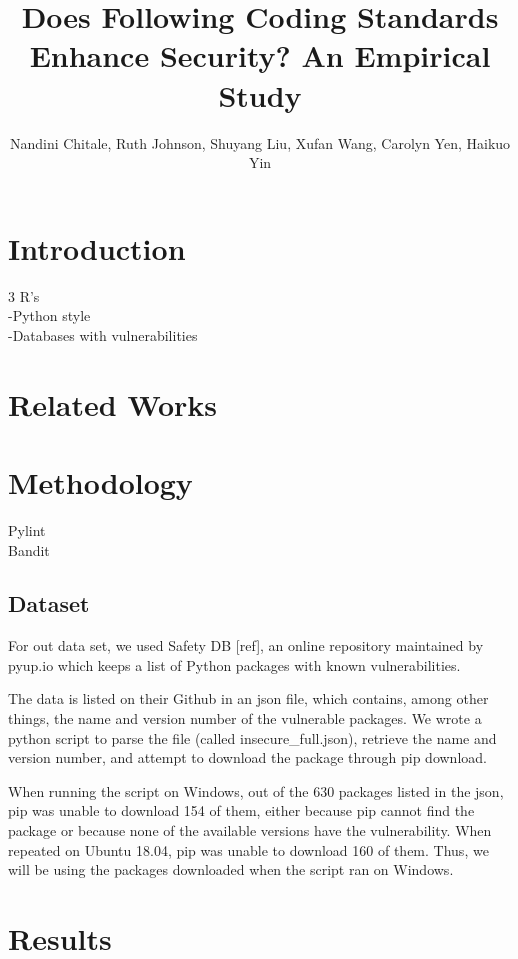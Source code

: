 \documentclass[sigconf]{acmart}
\title{Does Following Coding Standards Enhance Security? An Empirical Study}
\author{Nandini Chitale, Ruth Johnson, Shuyang Liu, Xufan Wang, Carolyn Yen, Haikuo Yin}
\begin{document}
\maketitle

\begin{abstract}
      
\end{abstract}
\section{Introduction}
3 R's\\
-Python style\\
-Databases with vulnerabilities\\
\section{Related Works}

\section{Methodology}
Pylint\\
Bandit\\
\subsection{Dataset}
For out data set, we used Safety DB [ref], an online repository maintained by pyup.io which keeps a list of Python packages with known vulnerabilities. 

The data is listed on their Github in an json file, which contains, among other things, the name and version number of the vulnerable packages. We wrote a python script to parse the file (called insecure\_full.json), retrieve the name and version number, and attempt to download the package through pip download.

When running the script on Windows, out of the 630 packages listed in the json, pip was unable to download 154 of them, either because pip cannot find the package or because none of the available versions have the vulnerability. When repeated on Ubuntu 18.04, pip was unable to download 160 of them. Thus, we will be using the packages downloaded when the script ran on Windows.

\section{Results}
\end{document}
